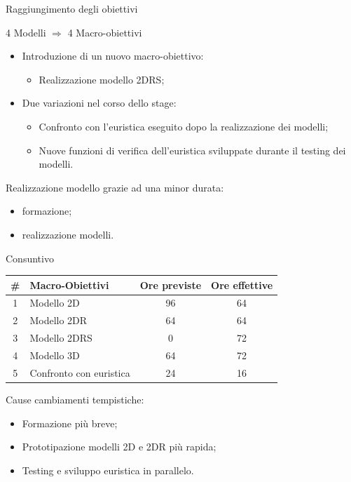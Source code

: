 \documentclass{beamer}
\begin{document}
\begin{frame}{Raggiungimento degli obiettivi}
	\begin{center}
		4 Modelli $\Rightarrow$ 4 Macro-obiettivi
	\end{center}
		
	\begin{itemize}
		\item Introduzione di un nuovo macro-obiettivo:
		      \begin{itemize}
		      	\item Realizzazione modello 2DRS;
		      \end{itemize}
		\item Due variazioni nel corso dello stage:
		      \begin{itemize}
		      	\item Confronto con l'euristica eseguito dopo la realizzazione dei modelli;
		      	\item Nuove funzioni di verifica dell'euristica sviluppate durante il testing dei modelli.
		      \end{itemize}
	\end{itemize}
	Realizzazione modello grazie ad una minor durata:
	\begin{itemize}
		\item formazione;
		\item realizzazione modelli.
	\end{itemize}
\end{frame}

\begin{frame}{Consuntivo}
	\begin{center}
		\begin{tabular}{|c |l|c|c|}
			\hline
			\textbf{\#} & \textbf{Macro-Obiettivi} & \textbf{Ore previste} & \textbf{Ore effettive} \\\hline
			1            & Modello 2D               & 96                    & 64                     \\\hline
			2            & Modello 2DR              & 64                    & 64                     \\\hline
			3            & Modello 2DRS             & 0                     & 72                     \\\hline
			4            & Modello 3D               & 64                    & 72                     \\\hline
			5            & Confronto con euristica  & 24                    & 16                     \\\hline
		\end{tabular}
	\end{center}
	Cause cambiamenti tempistiche:
	\begin{itemize}
		\item Formazione pi\`u breve;
		\item Prototipazione modelli 2D e 2DR più rapida;
		\item Testing e sviluppo euristica in parallelo.
	\end{itemize}
\end{frame}
\end{document}
